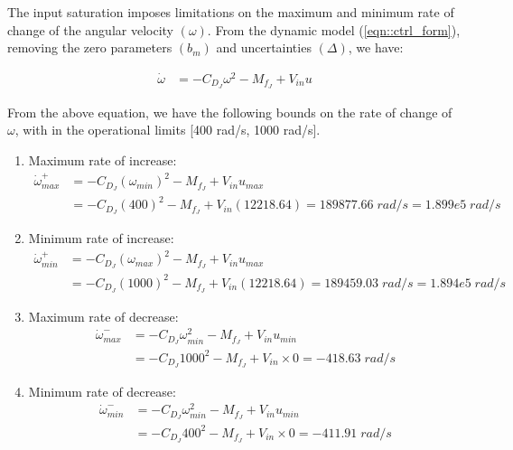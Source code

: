The input saturation imposes limitations on the maximum and minimum rate of
change of the angular velocity $(\omega)$. From the dynamic model (\ref{eqn::ctrl_form}), removing the zero parameters
$(b_m)$ and uncertainties $(\Delta)$, we have:

\begin{align*}
    \dot \omega &= -C_{D_J} \omega^2 - M_{f_J} + V_{in} u
\end{align*}

From the above equation, we have the following bounds on the rate of change of
$\omega$, with in the operational limits [400 rad/s, 1000 rad/s].

\begin{enumerate}
    \item Maximum rate of increase:
    \begin{align*}
        \dot \omega^{+}_{max} &= -C_{D_J} (\omega_{min})^2 - M_{f_J}+ V_{in} u_{max}\\
                              &= -C_{D_J} (400)^2 - M_{f_J} + V_{in} (12218.64)
                               =  189877.66 \; rad/s
                               = 1.899e5 \; rad/s
    \end{align*}

    \item Minimum rate of increase:
    \begin{align*}
        \dot \omega^{+}_{min} &= -C_{D_J} (\omega_{max})^2 - M_{f_J}+ V_{in} u_{max}\\
                              &= -C_{D_J} (1000)^2 - M_{f_J} + V_{in} (12218.64)
                               = 189459.03 \; rad/s = 1.894e5 \; rad/s
    \end{align*}

    \item Maximum rate of decrease:
    \begin{align*}
        \dot \omega^{-}_{max} &= -C_{D_J} \omega_{min}^2 - M_{f_J} + V_{in} u_{min}\\
                              &= -C_{D_J} 1000^2 - M_{f_J} + V_{in} \times 0
                               = -418.63 \; rad/s
    \end{align*}

    \item Minimum rate of decrease:
    \begin{align*}
        \dot \omega^{-}_{min} &= -C_{D_J} \omega_{min}^2 - M_{f_J} + V_{in} u_{min}\\
                              &= -C_{D_J} 400^2 - M_{f_J} + V_{in} \times 0  = -411.91 \; rad/s
    \end{align*}
\end{enumerate}

